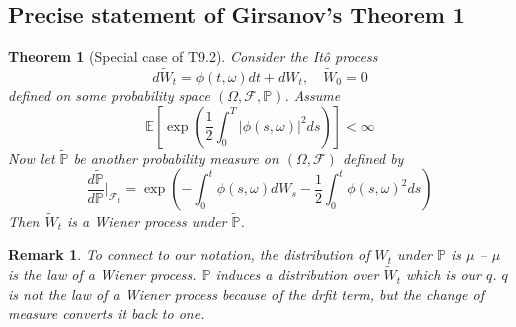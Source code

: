 \documentclass[11pt]{article}
\newtheorem{theorem}{Theorem}
\newtheorem{remark}{Remark}
\begin{document}
\subsection*{Precise statement of Girsanov's Theorem 1}

\begin{theorem}[Special case of T9.2]
Consider the It\^o process 
\begin{equation}
d\tilde{W}_t = \phi(t,\omega)dt + dW_t, \quad \tilde{W}_0 = 0
\end{equation}
defined on some probability space $(\Omega, {\mathcal F},{\mathbb P})$. 
Assume 
\begin{equation}
{\mathbb E}\left[\exp\left(\frac{1}{2}\int_0^T|\phi(s,\omega)|^2ds \right) \right]< \infty
\end{equation}
Now let $\tilde{\mathbb P}$ be another probability measure on $(\Omega, {\mathcal F})$ defined by 
\begin{equation}
\frac{d\tilde{\mathbb P}}{d{\mathbb P}}\Big|_{{\mathcal F}_t} =  \exp\left(- \int_0^t\phi(s,\omega)dW_s - \frac{1}{2}\int_0^t\phi(s,\omega)^2ds \right)
\end{equation}
Then $\tilde{W}_t$ is a Wiener process under $\tilde{\mathbb P}$. 
\end{theorem}

\begin{remark}
To connect to our notation, the distribution of $W_t$ under ${\mathbb P}$ is $\mu$ -- $\mu$ is the law of a Wiener process. ${\mathbb P}$ induces a distribution over $\tilde{W}_t$ which is our $q$. $q$ is not the law of a Wiener process because of the drfit term, but the change of measure converts it back to one. 
\end{remark}
\end{document}
